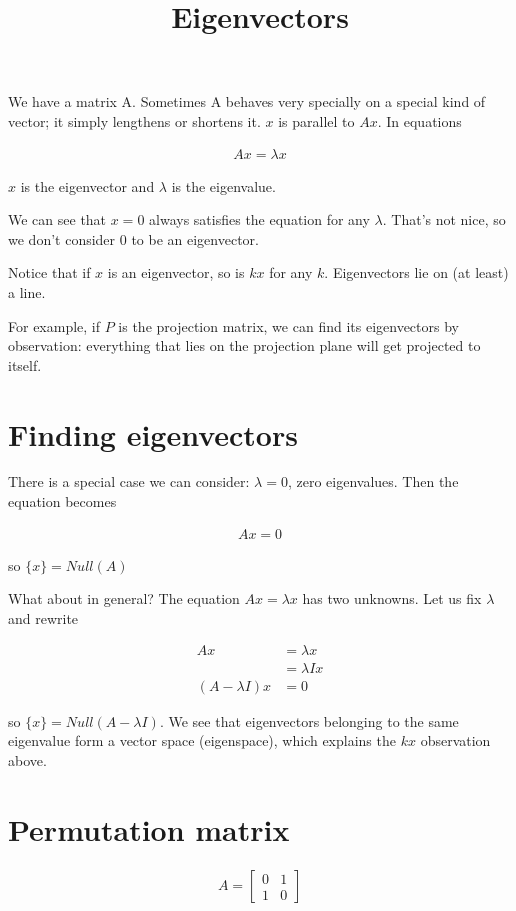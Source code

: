 \documentclass{article}
\title{Eigenvectors}
\date{}
\begin{document}
\maketitle

We have a matrix A. Sometimes A behaves very specially on a special kind of vector; it simply lengthens or shortens it. $x$ is parallel to $Ax$. In equations

\begin{align*}
Ax = \lambda x
\end{align*}

$x$ is the eigenvector and $\lambda$ is the eigenvalue.

We can see that $x=0$ always satisfies the equation for any $\lambda$. That's not nice, so we don't consider $0$ to be an eigenvector.

Notice that if $x$ is an eigenvector, so is $kx$ for any $k$. Eigenvectors lie on (at least) a line.

For example, if $P$ is the projection matrix, we can find its eigenvectors by observation: everything that lies on the projection plane will get projected to itself.

\section{Finding eigenvectors}

There is a special case we can consider: $\lambda = 0$, zero eigenvalues. Then the equation becomes

\begin{align*}
Ax = 0
\end{align*}

so $\{x\} = Null(A)$

What about in general? The equation $Ax = \lambda x$ has two unknowns. Let us fix $\lambda$ and rewrite

\begin{align*}
Ax &= \lambda x \\
&= \lambda I x \\
(A-\lambda I) x &= 0
\end{align*}

so $\{x\} = Null(A-\lambda I)$. We see that eigenvectors belonging to the same eigenvalue form a vector space (eigenspace), which explains the $kx$ observation above.

\section{Permutation matrix}
\begin{align*}
A =
\begin{bmatrix} 
0 & 1 \\ 
1 & 0
\end{bmatrix}
\end{align*}
\end{document}
